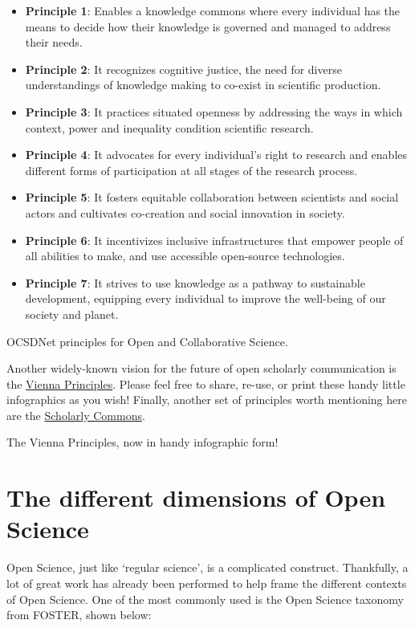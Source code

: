 \documentclass[]{book}
\begin{document}
\begin{itemize}
\item
  \textbf{Principle 1}: Enables a knowledge commons where every individual has the means to decide how their knowledge is governed and managed to address their needs.
\item
  \textbf{Principle 2}: It recognizes cognitive justice, the need for diverse understandings of knowledge making to co-exist in scientific production.
\item
  \textbf{Principle 3}: It practices situated openness by addressing the ways in which context, power and inequality condition scientific research.
\item
  \textbf{Principle 4}: It advocates for every individual's right to research and enables different forms of participation at all stages of the research process.
\item
  \textbf{Principle 5}: It fosters equitable collaboration between scientists and social actors and cultivates co-creation and social innovation in society.
\item
  \textbf{Principle 6}: It incentivizes inclusive infrastructures that empower people of all abilities to make, and use accessible open-source technologies.
\item
  \textbf{Principle 7}: It strives to use knowledge as a pathway to sustainable development, equipping every individual to improve the well-being of our society and planet.
\end{itemize}

OCSDNet principles for Open and Collaborative Science.

Another widely-known vision for the future of open scholarly communication is the \href{https://viennaprinciples.org/}{Vienna Principles}. Please feel free to share, re-use, or print these handy little infographics as you wish! Finally, another set of principles worth mentioning here are the \href{https://osf.io/6c2xt/}{Scholarly Commons}.

The Vienna Principles, now in handy infographic form!

\hypertarget{the-different-dimensions-of-open-science}{%
\section{The different dimensions of Open Science }\label{the-different-dimensions-of-open-science}}

Open Science, just like `regular science', is a complicated construct. Thankfully, a lot of great work has already been performed to help frame the different contexts of Open Science. One of the most commonly used is the Open Science taxonomy from FOSTER, shown below:
\end{document}
